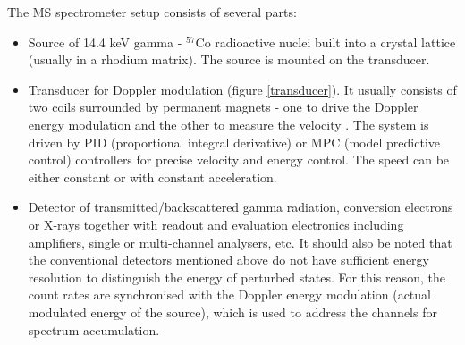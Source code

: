 The MS spectrometer setup consists of several parts:
\begin{itemize}

\item Source of 14.4 keV gamma - $^{57}$Co radioactive nuclei built into a crystal lattice (usually in a rhodium matrix). The source is mounted on the transducer.
\item Transducer for Doppler modulation (figure \ref{transducer}). It usually consists of two coils surrounded by permanent magnets - one to drive the Doppler energy modulation and the other to measure the velocity \cite{mossInstr}. The system is driven by PID (proportional integral derivative) or MPC (model predictive control) controllers for precise velocity and energy control. The speed can be either constant or with constant acceleration.

\item Detector of transmitted/backscattered gamma radiation, conversion electrons or X-rays together with readout and evaluation electronics including amplifiers, single or multi-channel analysers, etc. It should also be noted that the conventional detectors mentioned above do not have sufficient energy resolution to distinguish the energy of perturbed states. For this reason, the count rates are synchronised with the Doppler energy modulation (actual modulated energy of the source), which is used to address the channels for spectrum accumulation. 


\end{itemize}
%
%
%
%

